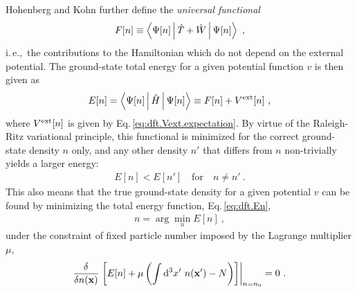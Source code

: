 Hohenberg and Kohn further define the \emph{universal functional} 
\begin{align}
	F[n] \equiv \Braket{\Psi [n] | \hat T + \hat W | \Psi [n]}~,
	\label{eq:dft.Fn}
\end{align}
i.\,e.,~the contributions to the Hamiltonian which do not depend on the external potential. The ground-state total energy for a given potential function $v$ is then given as
\begin{align}
	E [n] 
		= \Braket{\Psi [n] | \hat H | \Psi [n]}
		\equiv F[n] + V^{\rm ext}[n]~,
	\label{eq:dft.En}
\end{align}
where $V^{\rm ext}[n]$ is given by Eq.\,\eqref{eq:dft.Vext.expectation}.
By virtue of the Raleigh-Ritz variational principle, this functional is minimized for the correct ground-state density $n$ only, and any other density $n'$ that differs from $n$ non-trivially yields a larger energy:
\begin{align}
	E[n] < E [n'] \quad \text{for} \quad n \neq n'~.
\end{align}
This also means that the true ground-state density for a given potential $v$ can be found by minimizing the total energy function, Eq.\,\eqref{eq:dft.En},
\begin{align}
	n = \arg \min_{n} E[n]~,
	\label{eq:dft.n}
\end{align}
under the constraint of fixed particle number imposed by the Lagrange multiplier $\mu$,
\begin{align}
	\frac{\delta}{\delta n ({\bf x})}
		\left.\left[ 
			E[n] + \mu \left(
				\int {\rm d}^3 x' ~ n ({\bf x}') - N \right)
		\right]\right\vert_{n = n_0}
		=0~.
		\label{eq:dft.stationarity}
\end{align}

